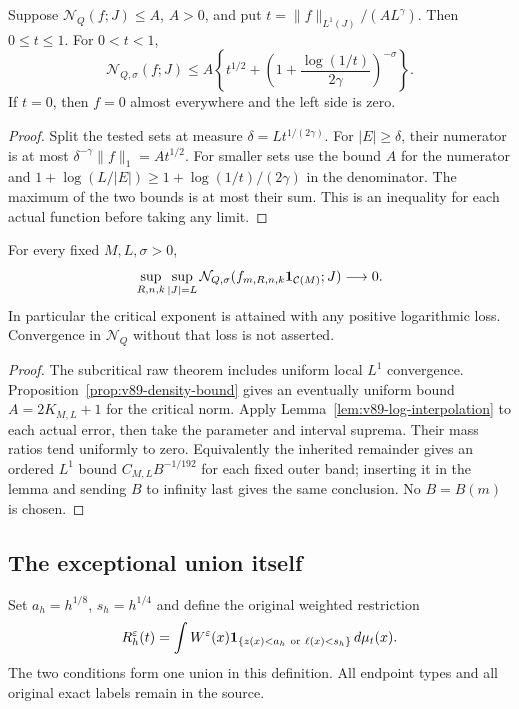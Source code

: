 \begin{lemma}
\label{lem:v89-log-interpolation}
Suppose $\mathcal N_Q(f;J)\le A$, $A>0$, and put
$t=\|f\|_{L^1(J)}/(AL^\gamma)$. Then $0\le t\le1$.
For $0<t<1$,
\begin{equation}\label{eq:v89-log-interpolation}
 \mathcal N_{Q,\sigma}(f;J)
 \le A\left\{t^{1/2}
       +\left(1+\frac{\log(1/t)}{2\gamma}\right)^{-\sigma}\right\}.
\end{equation}
If $t=0$, then $f=0$ almost everywhere and the left side is zero.
\end{lemma}
\begin{proof}
Split the tested sets at measure $\delta=Lt^{1/(2\gamma)}$.
For $|E|\ge\delta$, their numerator is at most
$\delta^{-\gamma}\|f\|_1=At^{1/2}$. For smaller sets use the
bound $A$ for the numerator and
$1+\log(L/|E|)\ge1+\log(1/t)/(2\gamma)$ in the denominator.
The maximum of the two bounds is at most their sum. This is an
inequality for each actual function before taking any limit.
\end{proof}

\begin{theorem}
\label{thm:v89-log-raw}
For every fixed $M,L,\sigma>0$,
\begin{equation}\label{eq:v89-log-raw}
 \sup_{R,n,k}\sup_{|J|=L}
 \mathcal N_{Q,\sigma}(f_{m,R,n,k}\one_{\mathcal C(M)};J)
                                                   \longrightarrow0.
\end{equation}
In particular the critical exponent is attained with any positive
logarithmic loss. Convergence in $\mathcal N_Q$ without that loss
is not asserted.
\end{theorem}
\begin{proof}
The subcritical raw theorem includes uniform local $L^1$
convergence. Proposition~\ref{prop:v89-density-bound} gives an
eventually uniform bound $A=2K_{M,L}+1$ for the critical norm.
Apply Lemma~\ref{lem:v89-log-interpolation} to each actual error,
then take the parameter and interval suprema. Their mass ratios
tend uniformly to zero. Equivalently the inherited remainder gives
an ordered $L^1$ bound $C_{M,L}B^{-1/192}$ for each fixed outer
band; inserting it in the lemma and sending $B$ to infinity last
gives the same conclusion. No $B=B(m)$ is chosen.
\end{proof}

\subsection{The exceptional union itself}
Set $a_h=h^{1/8}$, $s_h=h^{1/4}$ and define the original weighted
restriction
\begin{equation}\label{eq:v89-residual-source}
 R_h^\varepsilon(t)
  =\int W^\varepsilon(x)
       \one_{\{z(x)<a_h\ \mathrm{or}\ \ell(x)<s_h\}}\,d\mu_t(x).
\end{equation}
The two conditions form one union in this definition. All endpoint
types and all original exact labels remain in the source.

